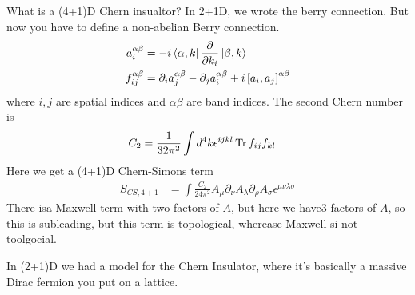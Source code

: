 What is a (4+1)D Chern insualtor?
In 2+1D,
we wrote the berry connection.
But now you have to define a non-abelian Berry connection.
\begin{align}
    a_i^{\alpha\beta} &=
    -i \bra{\alpha,k} \frac{\partial}{\partial k_i} \ket{\beta,k}\\
    f_{ij}^{\alpha\beta} &=
    \partial_i a_j^{\alpha\beta}
    - \partial_j a_i^{\alpha\beta}
    + i\left[ a_i, a_j \right]^{\alpha\beta}
\end{align}
where $i,j$ are spatial indices and $\alpha\beta$ are band indices.
The second Chern number is
\begin{align}
    C_2 &=
    \frac{1}{32\pi^2} \int d^4k
    \epsilon^{ijkl} \Tr f_{ij}f_{kl}
\end{align}
Here we get a (4+1)D Chern-Simons term
\begin{align}
    S_{CS,4+1} &=
    \int
    \frac{C_2}{24\pi^2} A_{\mu}\partial_\nu A_\lambda \partial_\rho A_\sigma
    \epsilon^{\mu\nu\lambda\sigma}
\end{align}
There isa Maxwell term with two factors of $A$,
but here we have3 factors of $A$,
so this is subleading,
but this term is topological,
wherease Maxwell si not toolgocial.

In (2+1)D we had a model for the Chern Insulator,
where it's basically a massive Dirac fermion you put on a lattice.

